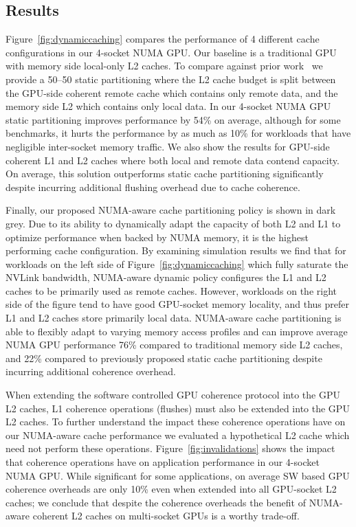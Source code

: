 \subsection{Results}

Figure~\ref{fig:dynamiccaching} compares the performance of 4 different cache
configurations in our 4-socket NUMA GPU. Our baseline is a traditional
GPU with memory side local-only L2 caches. To compare against prior work~\cite{Arunkumar2017} we
provide a 50--50 static partitioning where the L2 cache budget is split between the 
GPU-side coherent remote cache which contains only 
remote data, and the memory side L2 which contains only local data. In our 4-socket NUMA
GPU static partitioning improves performance by 54\% on average, although for some benchmarks, 
it hurts the performance by as much as 10\% for workloads that have negligible
inter-socket memory traffic. We also show the results for GPU-side
coherent L1 and L2 caches where both local and remote data contend capacity.
On average, this solution outperforms static cache partitioning significantly
despite incurring additional flushing overhead due to cache coherence.

Finally, our proposed NUMA-aware cache 
partitioning policy is shown in dark grey. Due to its ability to
dynamically adapt the capacity of both L2 and L1 to optimize performance when backed
by NUMA memory, it is the highest performing cache configuration. By examining
simulation results we find that for workloads on the left side of Figure~\ref{fig:dynamiccaching} 
which fully saturate the NVLink bandwidth, NUMA-aware dynamic policy configures the L1 and 
L2 caches to be primarily used as remote caches.  However, workloads on the right 
side of the figure tend to have good GPU-socket memory locality, and thus 
prefer L1 and L2 caches store primarily local data.  NUMA-aware cache
partitioning is able to flexibly adapt to varying memory access profiles and
can improve average NUMA GPU performance 76\% compared to traditional memory side L2
caches, and 22\% compared to previously proposed static cache partitioning despite
incurring additional coherence overhead.

When extending the software controlled GPU coherence protocol into the GPU L2 
caches, L1 coherence operations (flushes) must also be extended into the GPU 
L2 caches.  To further understand the impact these coherence operations have on our 
NUMA-aware cache performance we evaluated a hypothetical L2 cache which need not 
perform these operations. Figure~\ref{fig:invalidations} shows the impact that coherence
operations have on application performance in our 4-socket NUMA GPU.  While significant for
some applications, on average SW based GPU coherence overheads are only 10\% even
when extended into all GPU-socket L2 caches; we conclude that despite
the coherence overheads the benefit of NUMA-aware coherent L2 caches on 
multi-socket GPUs is a worthy trade-off.




